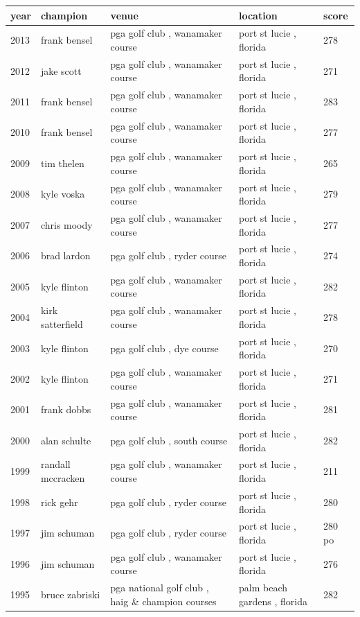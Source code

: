 \documentclass{article}
\begin{document}
\begin{tabular}{lllll}
\toprule
year & champion & venue & location & score \\
\midrule
2013 & frank bensel & pga golf club , wanamaker course & port st lucie , florida & 278 \\
2012 & jake scott & pga golf club , wanamaker course & port st lucie , florida & 271 \\
2011 & frank bensel & pga golf club , wanamaker course & port st lucie , florida & 283 \\
2010 & frank bensel & pga golf club , wanamaker course & port st lucie , florida & 277 \\
2009 & tim thelen & pga golf club , wanamaker course & port st lucie , florida & 265 \\
2008 & kyle voska & pga golf club , wanamaker course & port st lucie , florida & 279 \\
2007 & chris moody & pga golf club , wanamaker course & port st lucie , florida & 277 \\
2006 & brad lardon & pga golf club , ryder course & port st lucie , florida & 274 \\
2005 & kyle flinton & pga golf club , wanamaker course & port st lucie , florida & 282 \\
2004 & kirk satterfield & pga golf club , wanamaker course & port st lucie , florida & 278 \\
2003 & kyle flinton & pga golf club , dye course & port st lucie , florida & 270 \\
2002 & kyle flinton & pga golf club , wanamaker course & port st lucie , florida & 271 \\
2001 & frank dobbs & pga golf club , wanamaker course & port st lucie , florida & 281 \\
2000 & alan schulte & pga golf club , south course & port st lucie , florida & 282 \\
1999 & randall mccracken & pga golf club , wanamaker course & port st lucie , florida & 211 \\
1998 & rick gehr & pga golf club , ryder course & port st lucie , florida & 280 \\
1997 & jim schuman & pga golf club , ryder course & port st lucie , florida & 280 po \\
1996 & jim schuman & pga golf club , wanamaker course & port st lucie , florida & 276 \\
1995 & bruce zabriski & pga national golf club , haig \& champion courses & palm beach gardens , florida & 282 \\

\end{tabular}
\end{document}
